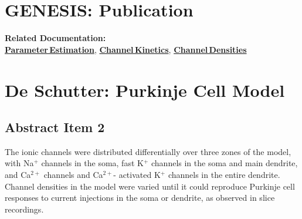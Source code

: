 \documentclass[12pt]{article}
\begin{document}
\section*{GENESIS: Publication}

{\bf Related Documentation:}\\
\href{../pub-purkinje-deschutter1-estimates/pub-purkinje-deschutter1-estimates.tex}{\bf Parameter\,Estimation},
\href{../pub-purkinje-deschutter1-table1/pub-purkinje-deschutter1-table1.tex}{\bf Channel\,Kinetics},
\href{../pub-purkinje-deschutter1-table2/pub-purkinje-deschutter1-table2.tex}{\bf Channel\,Densities}

\section*{De Schutter: Purkinje Cell Model}

\subsection*{Abstract Item 2}

The ionic channels were distributed differentially over three
zones of the model, with Na$^+$ channels in the soma, fast K$^+$ channels
in the soma and main dendrite, and Ca$^{2+}$ channels and Ca$^{2+}$-
activated K$^+$ channels in the entire dendrite. Channel densities in
the model were varied until it could reproduce Purkinje cell responses
to current injections in the soma or dendrite, as observed
in slice recordings.
\end{document}
